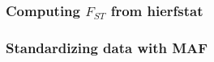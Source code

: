 \begin{frame}
\frametitle{Computing $F_{ST}$ from hierfstat}
\end{frame}

\begin{frame}
\frametitle{Standardizing data with MAF}
\end{frame}